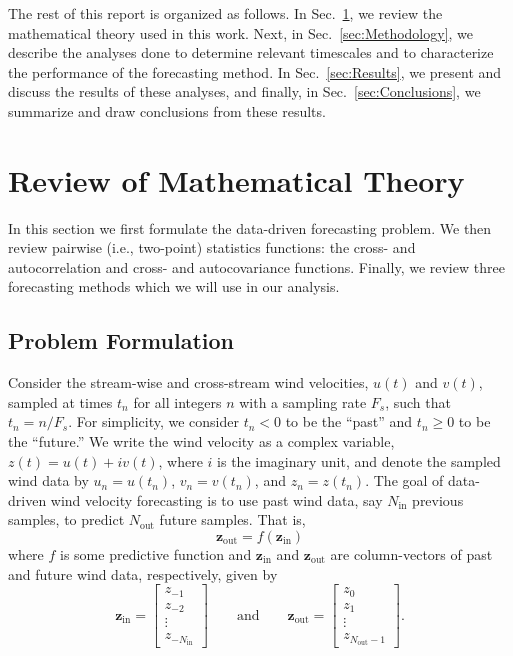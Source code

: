 \documentclass[11pt, oneside]{article}
\newcommand{\secref}[1]{Sec.~\ref{#1}}
\begin{document}
The rest of this report is organized as follows.
In \secref{sec:Theory}, we review the mathematical theory used in this work.
Next, in \secref{sec:Methodology}, we describe the analyses done to determine relevant timescales and to characterize the performance of the forecasting method.
In \secref{sec:Results}, we present and discuss the results of these analyses, and finally,
in \secref{sec:Conclusions}, we summarize and draw conclusions from these results.

\section{Review of Mathematical Theory}\label{sec:Theory}
In this section we first formulate the data-driven forecasting problem.
We then review pairwise (i.e., two-point) statistics functions: the cross- and autocorrelation and cross- and autocovariance functions.
Finally, we review three forecasting methods which we will use in our analysis.

\subsection{Problem Formulation}
Consider the stream-wise and cross-stream wind velocities, $u(t)$ and $v(t)$, sampled at times $t_n$ for all integers $n$ with a sampling rate $F_s$, such that $t_n = n/F_s$.
For simplicity, we consider $t_n < 0$ to be the ``past'' and $t_n \geq 0$ to be the ``future.''
We write the wind velocity as a complex variable, $z(t) = u(t) + i v(t)$, where $i$ is the imaginary unit, and denote the sampled wind data by $u_n = u(t_n)$, $v_n = v(t_n)$, and $z_n = z(t_n)$.
The goal of data-driven wind velocity forecasting is to use past wind data, say $N_\text{in}$ previous samples, to predict $N_\text{out}$ future samples.
That is, 
\begin{equation}
\mathbf{z}_\text{out} = f(\mathbf{z}_\text{in})
\end{equation}
where $f$ is some predictive function and $\mathbf{z}_\textrm{in}$ and $\mathbf{z}_\text{out}$ are column-vectors of past and future wind data, respectively, given by
\begin{equation}
\mathbf{z}_\text{in} = 
\begin{bmatrix}
z_{-1} \\ z_{-2} \\ \vdots \\ z_{-N_\text{in}}
\end{bmatrix}
\quad\quad \text{and} \quad\quad
\mathbf{z}_\text{out} = 
\begin{bmatrix}
z_{0} \\ z_{1} \\ \vdots \\ z_{N_\text{out} - 1}
\end{bmatrix}.
\end{equation}
\end{document}
